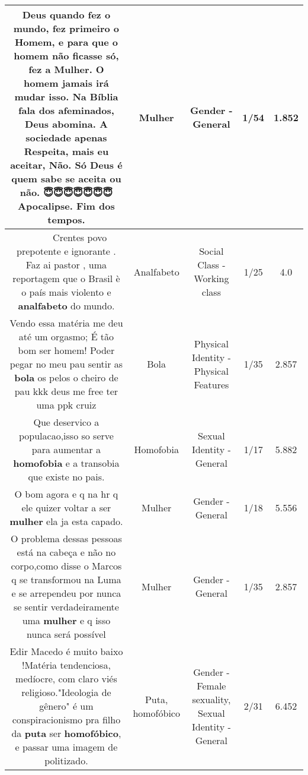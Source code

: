 \documentclass[11pt]{article}
\newlength\mylength
\begin{document}
\begin{center}
\begin{longtable}{|C{.65\mylength}|C{.30\mylength}|C{.12\mylength}|C{.12\mylength}|C{.12\mylength}|}
  \small Deus quando fez o mundo, fez primeiro o Homem, e para que o homem não ficasse só, fez a \textbf{Mulher}.  O homem jamais irá mudar isso. Na Bíblia fala dos afeminados,  Deus abomina.  A sociedade apenas Respeita, mais eu aceitar, Não.  Só Deus é quem sabe se aceita ou não.  😇😇😇😇😇😇😇Apocalipse. Fim dos tempos.\normalsize   & Mulher & Gender - General & 1/54 & 1.852 \\  \hline
  \small 🤮🤢💩💩💩💩💩💩💩 Crentes povo prepotente e ignorante . Faz ai pastor , uma reportagem que o Brasil è o país mais violento e \textbf{analfabeto} do mundo.\normalsize   & Analfabeto & Social Class - Working class & 1/25 & 4.0 \\  \hline
  \small Vendo essa matéria me deu até um orgasmo; É tão bom ser homem! Poder pegar no meu pau sentir as \textbf{bola} os pelos o cheiro de pau kkk deus me free ter uma ppk cruiz\normalsize   & Bola & Physical Identity - Physical Features & 1/35 & 2.857 \\  \hline
  \small Que deservico a populacao,isso so serve para aumentar a \textbf{homofobia} e a transobia que existe no pais.\normalsize   & Homofobia & Sexual Identity - General & 1/17 & 5.882 \\  \hline
  \small O bom agora e q na hr q ele quizer voltar a ser \textbf{mulher} ela ja esta capado.\normalsize   & Mulher & Gender - General & 1/18 & 5.556 \\  \hline
  \small O problema dessas pessoas está na cabeça e não no corpo,como disse o Marcos q se transformou na Luma e se arrependeu por nunca se sentir verdadeiramente uma \textbf{mulher} e q isso nunca será possível\normalsize   & Mulher & Gender - General & 1/35 & 2.857 \\  \hline
  \small Edir Macedo é muito baixo !Matéria tendenciosa, medíocre, com claro viés religioso."Ideologia de gênero" é um conspiracionismo pra filho da \textbf{puta} ser \textbf{homofóbico}, e passar uma imagem de politizado.\normalsize   & Puta, homofóbico & Gender - Female sexuality, Sexual Identity - General & 2/31 & 6.452 \\  \hline

\end{longtable}
\end{center}
\end{document}
